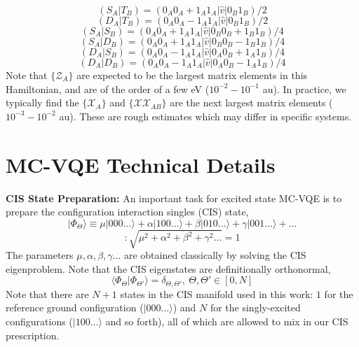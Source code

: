 \begin{equation}
(S_A | T_B) 
=
(0_A 0_A + 1_A 1_A | \hat v | 0_B 1_B) / 2
\end{equation}
\begin{equation}
(D_A | T_B) 
=
(0_A 0_A - 1_A 1_A | \hat v | 0_B 1_B) / 2
\end{equation}
\begin{equation}
(S_A | S_B)
=
(0_A 0_A + 1_A 1_A | \hat v | 0_B 0_B + 1_B 1_B) / 4
\end{equation}
\begin{equation}
(S_A | D_B)
=
(0_A 0_A + 1_A 1_A | \hat v | 0_B 0_B - 1_B 1_B) / 4
\end{equation}
\begin{equation}
(D_A | S_B)
=
(0_A 0_A - 1_A 1_A | \hat v | 0_A 0_B + 1_A 1_B) / 4
\end{equation}
\begin{equation}
(D_A | D_B)
=
(0_A 0_A - 1_A 1_A | \hat v | 0_A 0_B - 1_A 1_B) / 4
\end{equation}
Note that $\{ \mathcal{Z}_{A} \}$ are expected to be the largest matrix elements
in this Hamiltonian, and are of the order of a few eV ($10^{-2} - 10^{-1}$ au).
In practice, we typically find the $\{ \mathcal{X}_{A} \}$ and $\{
\mathcal{XX}_{AB} \}$ are the next largest matrix elements ($10^{-3} - 10^{-2}$
au). These are rough estimates which may differ in specific systems.

\section{MC-VQE Technical Details}

\textbf{CIS State Preparation:} An important task for excited state MC-VQE is to
prepare the configuration interaction singles (CIS) state,
\[
| \Phi_{\Theta} \rangle
\equiv
\mu | 000 \ldots \rangle
+
\alpha | 100\ldots \rangle
+
\beta | 010\ldots \rangle
+
\gamma | 001\ldots \rangle
+
\ldots
\]
\begin{equation}
:
\sqrt{
\mu^2
+
\alpha^2
+
\beta^2
+
\gamma^2
\ldots
}
=
1
\end{equation}
The parameters $\mu, \alpha, \beta, \gamma \ldots$ are obtained classically by
solving the CIS eigenproblem. Note that the CIS eigenstates are definitionally
orthonormal,
\begin{equation}
\langle \Phi_{\Theta} | \Phi_{\Theta'} \rangle
=
\delta_{\Theta, \Theta'}
, \
\Theta, \Theta' \in [0, N]
\end{equation}
Note that there are $N+1$ states in the CIS manifold used in this work: $1$ for
the reference ground configuration ($|000 \ldots \rangle$) and $N$ for the
singly-excited configurations ($|100 \ldots \rangle$ and so forth), all of which
are allowed to mix in our CIS prescription.

